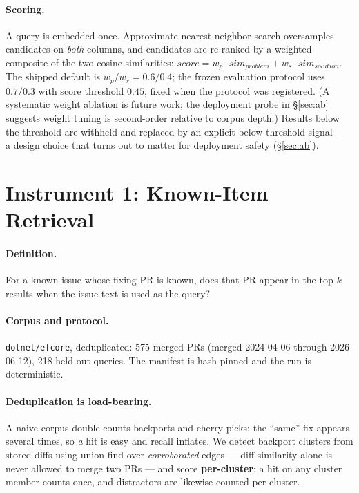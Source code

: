 \documentclass[sigconf,nonacm]{acmart}
\begin{document}
\paragraph{Scoring.}
A query is embedded once. Approximate nearest-neighbor search oversamples
candidates on \emph{both} columns, and candidates are re-ranked by a
weighted composite of the two cosine similarities:
$\mathit{score} = w_p \cdot \mathit{sim}_\mathit{problem} + w_s \cdot
\mathit{sim}_\mathit{solution}$.
The shipped default is $w_p/w_s = 0.6/0.4$; the frozen evaluation protocol
uses $0.7/0.3$ with score threshold $0.45$, fixed when the protocol was
registered. (A systematic weight ablation is future work; the deployment
probe in \S\ref{sec:ab} suggests weight tuning is second-order relative to
corpus depth.) Results below the threshold are withheld and replaced by an
explicit below-threshold signal --- a design choice that turns out to
matter for deployment safety (\S\ref{sec:ab}).

\section{Instrument 1: Known-Item Retrieval}
\label{sec:knownitem}

\paragraph{Definition.}
For a known issue whose fixing PR is known, does that PR appear in the
top-$k$ results when the issue text is used as the query?

\paragraph{Corpus and protocol.}
\texttt{dotnet/efcore}, deduplicated: 575 merged PRs (merged 2024-04-06
through 2026-06-12), 218 held-out queries. The manifest is hash-pinned and
the run is deterministic.

\paragraph{Deduplication is load-bearing.}
A naive corpus double-counts backports and cherry-picks: the ``same'' fix
appears several times, so \emph{a} hit is easy and recall inflates. We
detect backport clusters from stored diffs using union-find over
\emph{corroborated} edges --- diff similarity alone is never allowed to
merge two PRs --- and score \textbf{per-cluster}: a hit on any cluster
member counts once, and distractors are likewise counted per-cluster.
\end{document}
